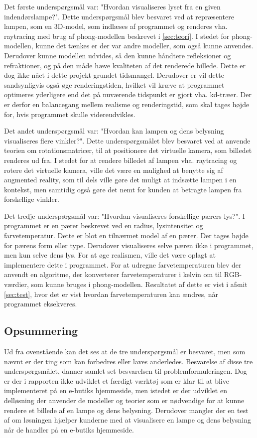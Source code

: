 Det første underspørgsmål var: "Hvordan visualiseres lyset fra en given indendørslampe?". Dette underspørgsmål blev besvaret ved at repræsentere lampen, som en 3D-model, som indlæses af programmet og renderes vha. raytracing med brug af phong-modellen beskrevet i \ref{sec:teori}. I stedet for phong-modellen, kunne det tænkes er der var andre modeller, som også kunne anvendes. Derudover kunne modellen udvides, så den kunne håndtere refleksioner og refraktioner, og på den måde hæve kvaliteten af det renderede billede. Dette er dog ikke nået i dette projekt grundet tidsmangel. Derudover er vil dette sandsynligvis også øge renderingstiden, hvilket vil kræve at programmet optimeres yderligere end det på nuværende tidspunkt er gjort vha. kd-træer. Der er derfor en balancegang mellem realisme og renderingstid, som skal tages højde for, hvis programmet skulle videreudvikles.

Det andet underspørgsmål var: "Hvordan kan lampen og dens belysning visualiseres flere vinkler?". Dette underspørgsmålet blev besvaret ved at anvende teorien om rotationsmatricer, til at positionere det virtuelle kamera, som billedet renderes ud fra. I stedet for at rendere billedet af lampen vha. raytracing og rotere det virtuelle kamera, ville det være en mulighed at benytte sig af augmented reality, som til dels ville gøre det muligt at indsætte lampen i en kontekst, men samtidig også gøre det nemt for kunden at betragte lampen fra forskellige vinkler.

Det tredje underspørgsmål var: "Hvordan visualiseres forskellige pærers lys?". I programmet er en pærer beskrevet ved en radius, lysintensitet og farvetemperatur. Dette er blot en tilnærmet model af en pærer. Der tages højde for pærens form eller type. Derudover visualiseres selve pæren ikke i programmet, men kun selve dens lys. For at øge realismen, ville det være oplagt at implementere dette i programmet. 
For at udregne farvetemperaturen blev der anvendt en algoritme, der konverterer farvetemperaturer i kelvin om til RGB-værdier, som kunne bruges i phong-modellen. Resultatet af dette er vist i afsnit \ref{sec:test}, hvor det er vist hvordan farvetemperaturen kan ændres, når programmet eksekveres. 

\subsection*{Opsummering}
Ud fra ovenstående kan det ses at de tre underspørgsmål er besvaret, men som nævnt er der ting som kan forbedres eller laves anderledes. Besvarelse af disse tre underspørgsmålet, danner samlet set besvarelsen til problemformuleringen. Dog er der i rapporten ikke udviklet et færdigt værktøj som er klar til at blive implementeret på en e-butiks hjemmeside, men istedet er der udviklet en delløsning der anvender de modeller og teorier som er nødvendige for at kunne rendere et billede af en lampe og dens belysning. Derudover mangler der en test af om løsningen hjælper kunderne med at visualisere en lampe og dens belysning når de handler på en e-butiks hjemmeside. 


